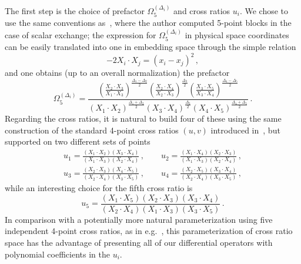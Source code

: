 \documentclass{article}
\begin{document}
	The first step is the choice of prefactor $\Omega^{(\Delta_i)}_5$ and cross ratios $u_i$. We chose to use the same conventions as~\cite{Rosenhaus:2018zqn}, where the author computed 5-point blocks in the case of scalar exchange; the expression for $\Omega^{(\Delta_i)}_5$ in physical space coordinates can be easily translated into one in embedding space through the simple relation
	\begin{equation}
		-2 X_{i}\cdot X_{j}=(x_{i}-x_j)^2\,,
		\label{relationconversion}
	\end{equation}
	and one obtains (up to an overall normalization) the prefactor
	\begin{equation}
		\Omega^{(\Delta_i)}_5=\frac{\left(\frac{X_2\cdot X_3}{X_1\cdot X_3}\right)^{\frac{\Delta_1-\Delta_2}{2}} \left(\frac{X_2\cdot X_4}{X_2\cdot X_3}\right)^{\frac{\Delta_3}{2}} 		\left(\frac{X_3\cdot X_5}{X_3\cdot X_4}\right)^{\frac{\Delta_4-\Delta_5}{2}}}{\left(X_1\cdot X_2\right)^{\frac{\Delta_1+\Delta_2}{2}}\left( X_3\cdot X_4\right)^{\frac{\Delta_3}{2}}\left(X_4\cdot X_5\right)^{\frac{\Delta_4+\Delta_5}{2}}} \,.
		\label{Omegafivepts}
	\end{equation}
	Regarding the cross ratios, it is natural to build four of these using the same construction of the standard 4-point cross ratios $(u,v)$ introduced in~\cite{Dolan:2000ut}, but supported on two different sets of points
	\begin{equation}
		\begin{gathered}
		u_1=\frac{\left(X_1\cdot X_2\right) \left(X_3\cdot X_4\right)}{\left(X_1\cdot X_3\right) \left(X_2 \cdot X_4\right)}\,, \qquad u_2=\frac{\left(X_1\cdot X_4\right) \left(X_2\cdot X_3\right)}{\left(X_1\cdot X_3\right) \left(X_2 \cdot X_4\right)}\,,\\
		u_3=\frac{\left(X_2\cdot X_3\right) \left(X_4\cdot X_5\right)}{\left(X_2\cdot X_4\right) \left(X_3 \cdot X_5\right)}\,, \qquad u_4=\frac{\left(X_2\cdot X_5\right) \left(X_3\cdot X_4\right)}{\left(X_2\cdot X_4\right) \left(X_3 \cdot X_5\right)}\,,
		\end{gathered}
	\label{firstfourucrossratios}
	\end{equation}
	while an interesting choice for the fifth cross ratio is
	\begin{equation}
	    u_5=\frac{\left(X_1\cdot X_5\right) \left(X_2\cdot X_3\right)\left(X_3\cdot X_4\right)}{\left(X_2\cdot X_4\right) \left(X_1 \cdot X_3\right)\left(X_3\cdot X_5\right)}\,.
	    \label{fifthucrossratio}
	\end{equation}
	In comparison with a potentially more natural parameterization using five independent 4-point cross ratios, as in e.g.~\cite{Parikh:2019dvm,Vieira:2020xfx}, this parameterization of cross ratio space has the advantage of presenting all of our differential operators with polynomial coefficients in the $u_i$.
	
\end{document}
